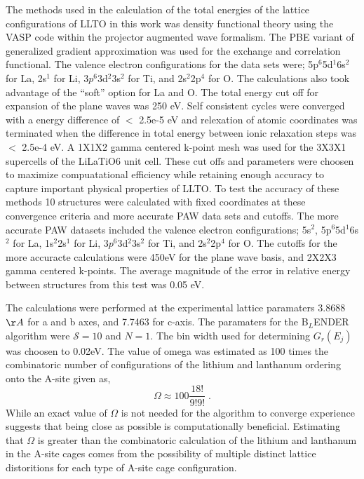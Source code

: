 \documentclass[aps,prl,reprint,superscriptaddress,showkeys]{revtex4-1}
\begin{document}
The methods used in the calculation of the total energies of the lattice configurations of LLTO in this work was density functional theory using the VASP code\cite{Vasp1,Vasp2,Vasp3,Vasp4} within the projector augmented wave formalism\cite{Blochl}. The PBE variant of generalized gradient approximation was used for the exchange and correlation functional\cite{PBE}. The valence electron configurations for the data sets were; 5p$^{6}$5d$^{1}$6s$^{2}$ for La, 2s$^{1}$ for Li, 3$p^{6}$3d$^{2}$3s$^{2}$ for Ti, and 2s$^{2}$2p$^{4}$ for O. The calculations also took advantage of the ``soft'' option for La and O.   The total energy cut off for expansion of the plane waves was 250 eV.  Self consistent cycles were converged with a energy difference of $<$ 2.5e-5 eV and relexation  of atomic coordinates was terminated when the difference in total energy between ionic relaxation steps was $<$ 2.5e-4 eV. A 1X1X2 gamma centered k-point mesh was used for the 3X3X1 supercells of the LiLaTiO6 unit cell. These cut offs and parameters were choosen to maximize compuatational efficiency while retaining enough accuracy to capture important physical properties of LLTO. To test the accuracy of these methods 10 structures were calculated with fixed coordinates at these convergence criteria and more accurate PAW data sets and cutoffs. The more accurate PAW datasets included the valence electron configurations; 5s$^{2}$, 5p$^{6}$5d$^{1}$6s$^{2}$ for La, 1s$^2$2s$^{1}$ for Li, 3$p^{6}$3d$^{2}$3s$^{2}$ for Ti, and 2s$^{2}$2p$^{4}$ for O.  The cutoffs for the more accuracte calculations were 450eV for the plane wave basis, and 2X2X3 gamma centered k-points. The average magnitude of the error in relative energy between structures from this test was 0.05 eV.

  The calculations were performed at the experimental lattice paramaters 3.8688$\AA$ for a and b axes, and 7.7463 for c-axis. The paramaters for the B$_L$ENDER algorithm were $\mathcal{S}=10$ and $N=1$. The bin width used for determining $G_r(E_j)$ was choosen to 0.02eV. The value of omega was estimated as 100 times the combinatoric number of configurations of the lithium and lanthanum ordering onto the A-site  given as, 
\begin{equation}
\Omega \approx 100\frac{18!}{9!9!} \;.
\end{equation}
While an exact value of $\Omega$ is not needed for the algorithm to converge experience suggests that being close as possible is computationally beneficial. Estimating that $\Omega$ is greater than the combinatoric calculation of the lithium and lanthanum in the A-site cages comes from the possibility of multiple distinct lattice distoritions for each type of A-site cage configuration. 
\end{document}
